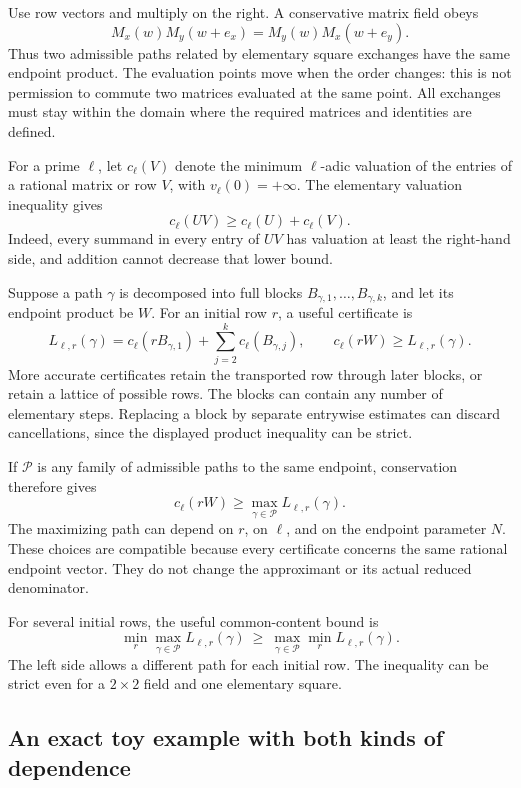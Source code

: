 \documentclass[11pt]{article}
\begin{document}
Use row vectors and multiply on the right.  A conservative matrix field obeys
\[
 M_x(w)M_y(w+e_x)=M_y(w)M_x(w+e_y).
\]
Thus two admissible paths related by elementary square exchanges have the
same endpoint product.  The evaluation points move when the order changes:
this is not permission to commute two matrices evaluated at the same point.
All exchanges must stay within the domain where the required matrices and
identities are defined.

For a prime $\ell$, let $c_\ell(V)$ denote the minimum $\ell$-adic
valuation of the entries of a rational matrix or row $V$, with
$v_\ell(0)=+\infty$.  The elementary valuation inequality gives
\[
 c_\ell(UV)\geq c_\ell(U)+c_\ell(V).
\]
Indeed, every summand in every entry of $UV$ has valuation at least the
right-hand side, and addition cannot decrease that lower bound.

Suppose a path $\gamma$ is decomposed into full blocks
$B_{\gamma,1},\ldots,B_{\gamma,k}$, and let its endpoint product be $W$.
For an initial row $r$, a useful certificate is
\[
 L_{\ell,r}(\gamma)
 =c_\ell(rB_{\gamma,1})+
   \sum_{j=2}^k c_\ell(B_{\gamma,j}),
 \qquad
 c_\ell(rW)\geq L_{\ell,r}(\gamma).
\]
More accurate certificates retain the transported row through later
blocks, or retain a lattice of possible rows.  The blocks can contain any
number of elementary steps.  Replacing a block by separate entrywise
estimates can discard cancellations, since the displayed product
inequality can be strict.

If $\mathcal P$ is any family of admissible paths to the same endpoint,
conservation therefore gives
\[
 c_\ell(rW)\geq\max_{\gamma\in\mathcal P}
 L_{\ell,r}(\gamma).
\]
The maximizing path can depend on $r$, on $\ell$, and on the endpoint
parameter $N$.  These choices are compatible because every certificate
concerns the same rational endpoint vector.  They do not change the
approximant or its actual reduced denominator.

For several initial rows, the useful common-content bound is
\[
 \min_r\max_{\gamma\in\mathcal P}L_{\ell,r}(\gamma)
 \ \geq\
 \max_{\gamma\in\mathcal P}\min_r L_{\ell,r}(\gamma).
\]
The left side allows a different path for each initial row.  The inequality
can be strict even for a $2\times2$ field and one elementary square.

\subsection{An exact toy example with both kinds of dependence}
\end{document}
